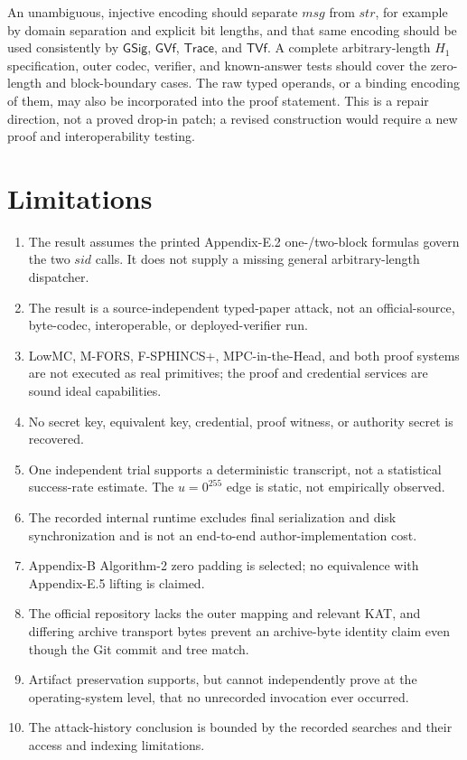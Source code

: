 \documentclass[10pt,a4paper]{article}
\newcommand{\Hone}{H_1}
\newcommand{\sid}{\mathit{sid}}
\newcommand{\strr}{\mathit{str}}
\newcommand{\msg}{\mathit{msg}}
\newcommand{\GVf}{\mathsf{GVf}}
\newcommand{\GSig}{\mathsf{GSig}}
\newcommand{\Trace}{\mathsf{Trace}}
\newcommand{\TVf}{\mathsf{TVf}}
\begin{document}
An unambiguous, injective encoding should separate $\msg$ from $\strr$, for
example by domain separation and explicit bit lengths, and that same encoding
should be used consistently by $\GSig$, $\GVf$, $\Trace$, and $\TVf$. A
complete arbitrary-length $\Hone$ specification, outer codec, verifier, and
known-answer tests should cover the zero-length and block-boundary cases. The
raw typed operands, or a binding encoding of them, may also be incorporated
into the proof statement. This is a repair direction, not a proved drop-in
patch; a revised construction would require a new proof and interoperability
testing.

\section{Limitations}

\begin{enumerate}
  \item The result assumes the printed Appendix-E.2 one-/two-block formulas
        govern the two $\sid$ calls. It does not supply a missing general
        arbitrary-length dispatcher.
  \item The result is a source-independent typed-paper attack, not an
        official-source, byte-codec, interoperable, or deployed-verifier run.
  \item LowMC, M-FORS, F-SPHINCS+, MPC-in-the-Head, and both proof systems are
        not executed as real primitives; the proof and credential services
        are sound ideal capabilities.
  \item No secret key, equivalent key, credential, proof witness, or authority
        secret is recovered.
  \item One independent trial supports a deterministic transcript, not a
        statistical success-rate estimate. The $u=0^{255}$ edge is static,
        not empirically observed.
  \item The recorded internal runtime excludes final serialization and disk
        synchronization and is not an end-to-end author-implementation cost.
  \item Appendix-B Algorithm-2 zero padding is selected; no equivalence with
        Appendix-E.5 lifting is claimed.
  \item The official repository lacks the outer mapping and relevant KAT, and
        differing archive transport bytes prevent an archive-byte identity
        claim even though the Git commit and tree match.
  \item Artifact preservation supports, but cannot independently prove at the
        operating-system level, that no unrecorded invocation ever occurred.
  \item The attack-history conclusion is bounded by the recorded searches and
        their access and indexing limitations.
\end{enumerate}
\end{document}
